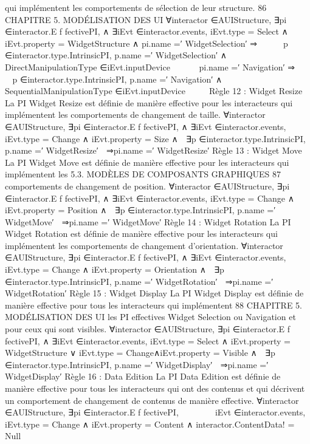 \documentclass{article}
\begin{document}
qui implémentent les comportements de sélection de leur structure.
86
CHAPITRE 5. MODÉLISATION DES UI
∀interactor ∈AUIStructure, ∃pi ∈interactor.E f fectivePI,
∧
∃iEvt ∈interactor.events, iEvt.type = Select
∧
iEvt.property = WidgetStructure
∧
pi.name =′ WidgetSelection′ ⇒




∃p ∈interactor.type.IntrinsicPI,
p.name =′ WidgetSelection′
∧
DirectManipulationType ∈iEvt.inputDevice




∧
pi.name =′ Navigation′ ⇒




∃p ∈interactor.type.IntrinsicPI,
p.name =′ Navigation′
∧
SequentialManipulationType ∈iEvt.inputDevice




Règle 12 : Widget Resize
La PI Widget Resize est déﬁnie de manière effective pour les interacteurs qui implémentent les
comportements de changement de taille.
∀interactor ∈AUIStructure, ∃pi ∈interactor.E f fectivePI,
∧
∃iEvt ∈interactor.events, iEvt.type = Change
∧
iEvt.property = Size
∧
 ∃p ∈interactor.type.IntrinsicPI,
p.name =′ WidgetResize′

⇒pi.name =′ WidgetResize′
Règle 13 : Widget Move
La PI Widget Move est déﬁnie de manière effective pour les interacteurs qui implémentent les
5.3. MODÈLES DE COMPOSANTS GRAPHIQUES
87
comportements de changement de position.
∀interactor ∈AUIStructure,
∃pi ∈interactor.E f fectivePI,
∧
∃iEvt ∈interactor.events,
iEvt.type = Change
∧
iEvt.property = Position
∧
 ∃p ∈interactor.type.IntrinsicPI,
p.name =′ WidgetMove′

⇒pi.name =′ WidgetMove′
Règle 14 : Widget Rotation
La PI Widget Rotation est déﬁnie de manière effective pour les interacteurs qui implémentent les
comportements de changement d’orientation.
∀interactor ∈AUIStructure,
∃pi ∈interactor.E f fectivePI,
∧
∃iEvt ∈interactor.events,
iEvt.type = Change
∧
iEvt.property = Orientation
∧
 ∃p ∈interactor.type.IntrinsicPI,
p.name =′ WidgetRotation′

⇒pi.name =′ WidgetRotation′
Règle 15 : Widget Display
La PI Widget Display est déﬁnie de manière effective pour tous les interacteurs qui implémentent
88
CHAPITRE 5. MODÉLISATION DES UI
les PI effectives Widget Selection ou Navigation et pour ceux qui sont visibles.
∀interactor ∈AUIStructure, ∃pi ∈interactor.E f fectivePI,
∧
∃iEvt ∈interactor.events, iEvt.type = Select
∧
iEvt.property = WidgetStructure
∨
iEvt.type = Change∧iEvt.property = Visible
∧
 ∃p ∈interactor.type.IntrinsicPI,
p.name =′ WidgetDisplay′

⇒pi.name =′ WidgetDisplay′
Règle 16 : Data Edition
La PI Data Edition est déﬁnie de manière effective pour tous les interacteurs qui ont des contenus
et qui décrivent un comportement de changement de contenus de manière effective.
∀interactor ∈AUIStructure, ∃pi ∈interactor.E f fectivePI,






∃iEvt ∈interactor.events, iEvt.type = Change
∧
iEvt.property = Content
∧
interactor.ContentData! = Null
\end{document}
